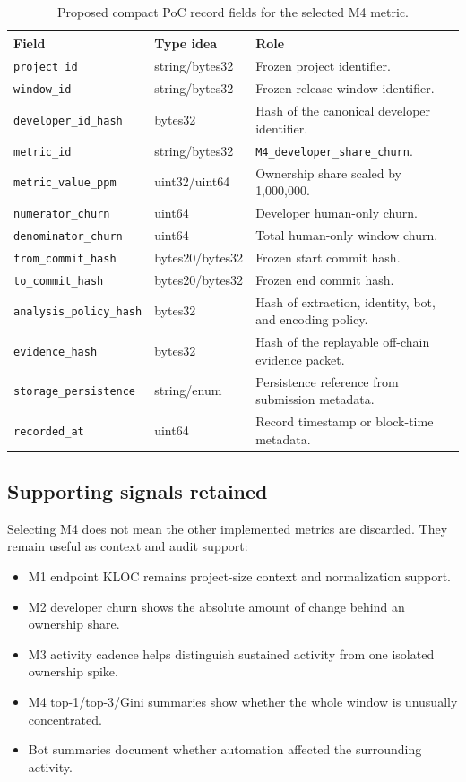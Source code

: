 \begin{table}[H]
\centering
\scriptsize
\renewcommand{\arraystretch}{1.08}
\begin{tabularx}{\textwidth}{p{3.2cm}p{2.4cm}X}
\toprule
\textbf{Field} & \textbf{Type idea} & \textbf{Role} \\
\midrule
\texttt{project\_id} & string/bytes32 & Frozen project identifier. \\
\texttt{window\_id} & string/bytes32 & Frozen release-window identifier. \\
\texttt{developer\_id\_hash} & bytes32 & Hash of the canonical developer identifier. \\
\texttt{metric\_id} & string/bytes32 & \texttt{M4\_developer\_share\_churn}. \\
\texttt{metric\_value\_ppm} & uint32/uint64 & Ownership share scaled by 1,000,000. \\
\texttt{numerator\_churn} & uint64 & Developer human-only churn. \\
\texttt{denominator\_churn} & uint64 & Total human-only window churn. \\
\texttt{from\_commit\_hash} & bytes20/bytes32 & Frozen start commit hash. \\
\texttt{to\_commit\_hash} & bytes20/bytes32 & Frozen end commit hash. \\
\texttt{analysis\_policy\_hash} & bytes32 & Hash of extraction, identity, bot, and encoding policy. \\
\texttt{evidence\_hash} & bytes32 & Hash of the replayable off-chain evidence packet. \\
\texttt{storage\_persistence} & string/enum & Persistence reference from submission metadata. \\
\texttt{recorded\_at} & uint64 & Record timestamp or block-time metadata. \\
\bottomrule
\end{tabularx}
\caption{Proposed compact PoC record fields for the selected M4 metric.}
\label{tab:selected_metric_record_fields}
\end{table}

\subsection{Supporting signals retained}
\label{sec:selected_metric_supporting_signals}

Selecting M4 does not mean the other implemented metrics are discarded. They remain useful as context and audit
support:
\begin{itemize}[leftmargin=*]
  \item M1 endpoint KLOC remains project-size context and normalization support.
  \item M2 developer churn shows the absolute amount of change behind an ownership share.
  \item M3 activity cadence helps distinguish sustained activity from one isolated ownership spike.
  \item M4 top-1/top-3/Gini summaries show whether the whole window is unusually concentrated.
  \item Bot summaries document whether automation affected the surrounding activity.
\end{itemize}


